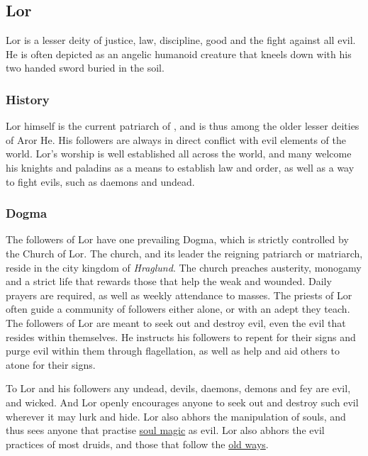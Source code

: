 \subsection{Lor}
\label{sec:Lor}

Lor is a lesser deity of justice, law, discipline, good and the fight against
all evil. He is often depicted as an angelic humanoid creature that kneels
down with his two handed sword buried in the soil.

\subsubsection{History}

Lor himself is the current patriarch of , and is thus
among the older lesser deities of Aror He. His followers are always in direct
conflict with evil elements of the world. Lor's worship is well established
all across the world, and many welcome his knights and paladins as a means to
establish law and order, as well as a way to fight evils, such as daemons and
undead.

\subsubsection{Dogma}

The followers of Lor have one prevailing Dogma, which is strictly controlled
by the Church of Lor. The church, and its leader the reigning patriarch or
matriarch, reside in the city kingdom of \emph{Hraglund}. The church preaches
austerity, monogamy and a strict life that rewards those that help the weak
and wounded. Daily prayers are required, as well as weekly attendance to
masses. The priests of Lor often guide a community of followers either alone,
or with an adept they teach. The followers of Lor are meant to seek out and
destroy evil, even the evil that resides within themselves. He instructs his
followers to repent for their signs and purge evil within them through
flagellation, as well as help and aid others to atone for their signs.

To Lor and his followers any undead, devils, daemons, demons and fey are evil,
and wicked. And Lor openly encourages anyone to seek out and destroy such
evil wherever it may lurk and hide. Lor also abhors the manipulation of souls,
and thus sees anyone that practise \hyperref[sec:Soul Magic]{soul magic} as
evil. Lor also abhors the evil practices of most druids, and those that follow
the \hyperref[sec:Old Ways]{old ways}.

